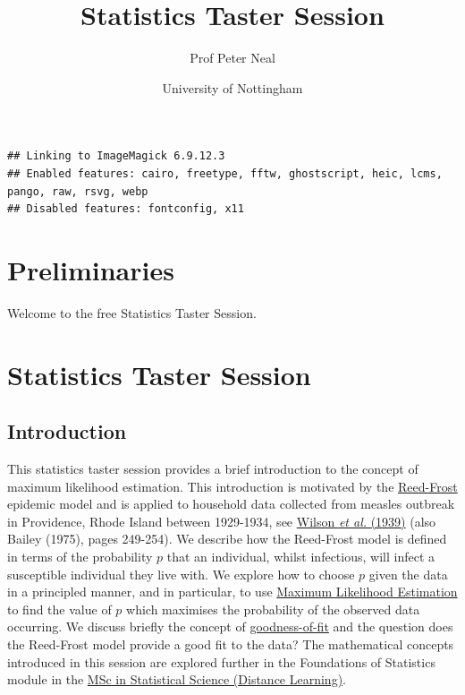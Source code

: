 \documentclass[
]{book}
\title{Statistics Taster Session}
\author{Prof Peter Neal}
\date{University of Nottingham}
\begin{document}
\maketitle

{
\setcounter{tocdepth}{1}
\tableofcontents
}
\begin{verbatim}
## Linking to ImageMagick 6.9.12.3
## Enabled features: cairo, freetype, fftw, ghostscript, heic, lcms, pango, raw, rsvg, webp
## Disabled features: fontconfig, x11
\end{verbatim}

\hypertarget{preliminaries}{%
\chapter*{Preliminaries}\label{preliminaries}}

Welcome to the free Statistics Taster Session.

\hypertarget{stats_taster}{%
\chapter{Statistics Taster Session}\label{stats_taster}}

\hypertarget{sec_intro}{%
\section{Introduction}\label{sec_intro}}

This statistics taster session provides a brief introduction to the concept of maximum likelihood estimation. This introduction is motivated by the \href{https://en.wikipedia.org/wiki/Reed\%E2\%80\%93Frost_model}{Reed-Frost} epidemic model and is applied to household data collected from measles outbreak in Providence, Rhode Island between 1929-1934, see
\href{https://www.jstor.org/stable/984949\#metadata_info_tab_contents}{Wilson \emph{et al.} (1939)} (also
Bailey (1975), pages 249-254). We describe how the Reed-Frost model is defined in terms of the probability \(p\) that an individual, whilst infectious, will infect a susceptible individual they live with. We explore how to choose \(p\) given the data in a principled manner, and in particular, to use \protect\hyperlink{sec_like}{Maximum Likelihood Estimation} to find the value of \(p\) which maximises the probability of the observed data occurring. We discuss briefly the concept of \protect\hyperlink{sec_GoF}{goodness-of-fit} and the question does the Reed-Frost model provide a good fit to the data? The mathematical concepts introduced in this session are explored further in the Foundations of Statistics module in the \href{https://www.nottingham.ac.uk/pgstudy/course/taught/statistical-science-distance-learning-msc}{MSc in Statistical Science (Distance Learning)}.
\end{document}
